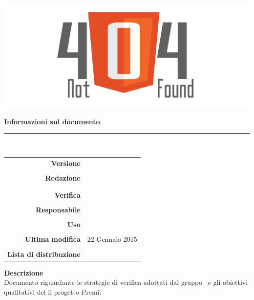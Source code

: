 \thispagestyle{empty}

\begin{titlepage}
	\begin{center}
	\begin{Huge}
		\textbf{\gruppo} \\
	\end{Huge}
	\vspace{0.5cm}
	\begin{Large}
		\textbf{\capitolato}
	\end{Large}
	
	\vspace{1cm}
    
	\includegraphics[scale=0.35]{../logo/logo404_Extends.png}
	\vspace{1cm}
	\begin{Huge}
		\textbf{\titDoc}
	\end{Huge}
	
	\vspace{1cm}
	\textbf{Informazioni sul documento}\\
    \rule{10cm}{.4pt} \\
	\begin{table}[h]
	\begin{center}
	\begin{tabular}{r | l}
		\textbf{Versione} & \versione \\ \\
		\textbf{Redazione} & \DeEn \\
			& \VeFe \\ \\
		\textbf{Verifica} &\CaMa \\ \\
		\textbf{Responsabile} & \GoIs\\ \\
		\textbf{Uso} & \uso \\ \\
		\textbf{Ultima modifica} & 22 Gennaio 2015 \\ \\
		\textbf{Lista di distribuzione} & \gruppo \\ 
	\end{tabular}
	\end{center}
	\end{table}
			\textbf{Descrizione} \\
            Documento riguardante le strategie di verifica adottati dal gruppo \gruppo\ e gli obiettivi qualitativi
            del il progetto Premi.
	\end{center}
\end{titlepage}